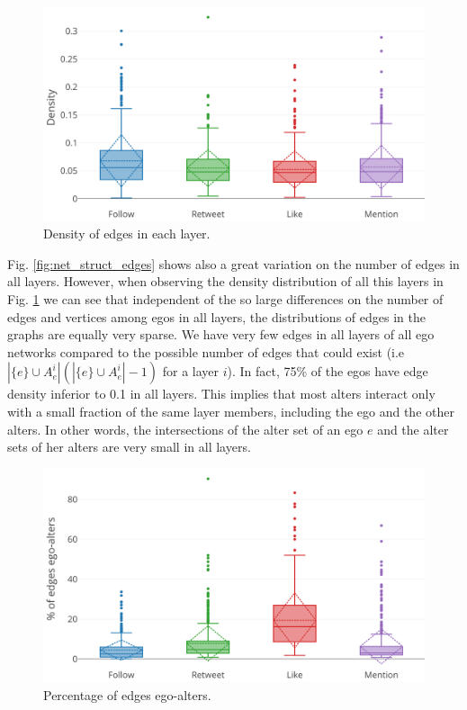 \begin{figure}[h!tb]
    \centering
    \includegraphics[width=1\textwidth]{fig/net_struct/density.png}
    \caption{Density of edges in each layer.}
    \label{fig:net_struct_density}
\end{figure}



Fig. \ref{fig:net_struct_edges}  shows also  a great variation on the number of edges in all layers. However, when observing the density distribution of all this layers in Fig. \ref{fig:net_struct_density} we can see that independent of the so large differences on the number of edges and vertices among egos in all layers, the distributions of edges in the graphs are equally very sparse. We have very few edges in all layers of all ego networks compared to the possible number of edges that could exist (i.e $|\{e\}\cup A_e^i|(|\{e\}\cup A_e^i|-1)$ for a layer $i$). In fact, 75\% of the egos have edge density inferior to 0.1 in all layers. This implies that most alters interact only with a small fraction of the same layer members, including the ego and the other alters. In other words, the intersections of the alter set of an ego  $e$ and the alter sets of her alters are very small in all layers.

\begin{figure}[h!tb]
    \centering
    \includegraphics[width=1\textwidth]{fig/net_struct/edges_ego_alters.png}
    \caption{Percentage of edges ego-alters.}
    \label{fig:net_struct_edges_ego_alters}
\end{figure}

